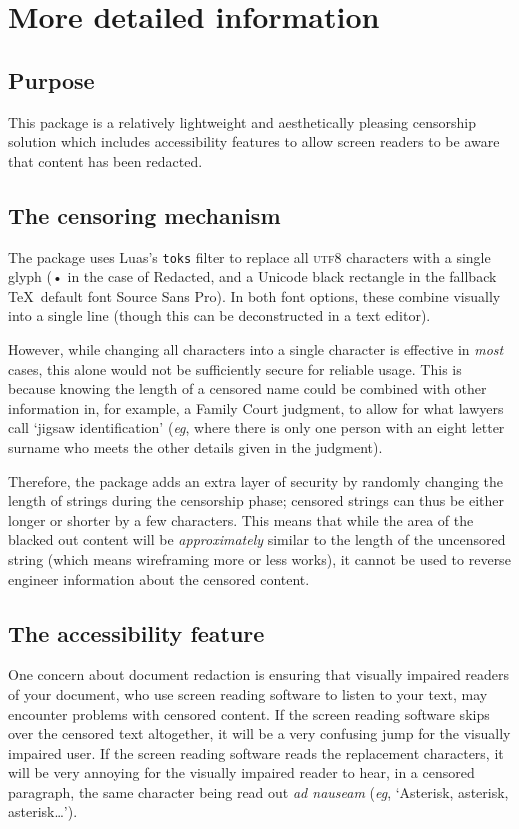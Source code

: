 \documentclass{article}
\begin{document}
 \clearpage



\section{More detailed information}
\subsection{Purpose}
This package is a relatively lightweight and aesthetically pleasing censorship solution which includes accessibility features to allow screen readers to be aware that content has been redacted.  
\subsection{The censoring mechanism}
The package uses Luas's \texttt{toks}  filter to replace all \textsc{utf8} characters with a single glyph (• in the case of Redacted, and a Unicode black rectangle in the fallback \TeX\ default font Source Sans Pro).  In both font options, these combine visually into a single line (though this can be deconstructed in a text editor).

  However, while changing all characters into a single character is effective in \textit{most} cases, this alone would not be sufficiently secure for reliable usage.  This is because knowing the length of a censored name could be combined with other information in, for example, a Family Court judgment, to allow for what lawyers call `jigsaw identification' (\textit{eg}, where there is only one person with an eight letter surname who meets the other details given in the judgment).  

Therefore, the package adds an extra layer of security by randomly changing the length of strings during the censorship phase; censored strings can thus be either longer or shorter by a few characters.  This means that while the area of the blacked out content will be \textit{approximately} similar to the length of the uncensored string (which means wireframing more or less works), it cannot be used to reverse engineer information about the censored content.  

\subsection{The accessibility feature}
One concern about document redaction is ensuring that visually impaired readers of your document, who use screen reading software to listen to your text, may encounter problems with censored content.  If the screen reading software skips over the censored text altogether, it will be a very confusing jump for the visually impaired user.  If the screen reading software reads the replacement characters, it will be very annoying for the visually impaired reader to hear, in a censored paragraph, the same character being read out \textit{ad nauseam} (\textit{eg}, `Asterisk, asterisk, asterisk…').
\end{document}
